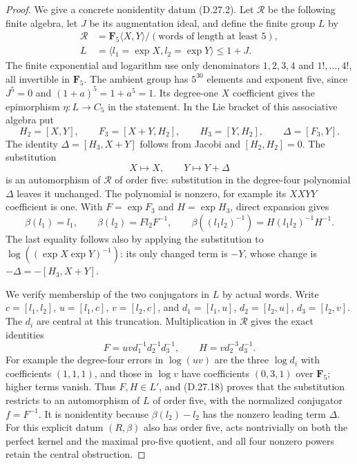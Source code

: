 \begin{proof}
We give a concrete nonidentity datum \textup{(D.27.2)}.
Let $\mathcal R$ be the following finite algebra, let $J$ be
its augmentation ideal, and define the finite group $L$ by
\[
 \begin{aligned}
 \mathcal R&=\mathbf F_5\langle X,Y\rangle/
                  (\text{words of length at least }5),\\
 L&=\langle l_1=\exp X,l_2=\exp Y\rangle\leq1+J.
 \end{aligned}
 \tag{D.27.15}
\]
The finite exponential and logarithm use only denominators
$1,2,3,4$ and $1!,\ldots,4!$, all invertible in
$\mathbf F_5$.  The ambient group has $5^{30}$ elements
and exponent five, since $J^5=0$ and $(1+a)^5=1+a^5=1$.
Its degree-one $X$ coefficient gives the epimorphism
$\eta:L\to C_5$ in the statement.
In the Lie bracket of this associative algebra put
\[
 H_2=[X,Y],\qquad F_3=[X+Y,H_2],\qquad
 H_3=[Y,H_2],\qquad \Delta=[F_3,Y].
 \tag{D.27.16}
\]
The identity $\Delta=[H_3,X+Y]$ follows from Jacobi and
$[H_2,H_2]=0$.  The substitution
\[
             X\longmapsto X,\qquad Y\longmapsto Y+\Delta
 \tag{D.27.17}
\]
is an automorphism of $\mathcal R$ of order five: substitution
in the degree-four polynomial $\Delta$ leaves it unchanged.
The polynomial is nonzero, for example its $XXYY$ coefficient
is one.  With $F=\exp F_3$ and $H=\exp H_3$, direct expansion
gives
\[
 \beta(l_1)=l_1,\qquad
 \beta(l_2)=F l_2F^{-1},\qquad
 \beta((l_1l_2)^{-1})=H(l_1l_2)^{-1}H^{-1}.
 \tag{D.27.18}
\]
The last equality follows also by applying the substitution
to $\log((\exp X\exp Y)^{-1})$: its only changed term is
$-Y$, whose change is $-\Delta=-[H_3,X+Y]$.

We verify membership of the two conjugators in $L$ by actual
words.  Write $c=[l_1,l_2]$, $u=[l_1,c]$, $v=[l_2,c]$,
and $d_1=[l_1,u]$, $d_2=[l_2,u]$, $d_3=[l_2,v]$.
The $d_i$ are central at this truncation.  Multiplication
in $\mathcal R$ gives the exact identities
\[
       F=uvd_1^{-1}d_2^{-1}d_3^{-1},\qquad
       H=v d_2^{-3}d_3^{-1}.
 \tag{D.27.19}
\]
For example the degree-four errors in $\log(uv)$ are the
three $\log d_i$ with coefficients $(1,1,1)$, and those in
$\log v$ have coefficients $(0,3,1)$ over $\mathbf F_5$;
higher terms vanish.  Thus $F,H\in L'$, and
\textup{(D.27.18)} proves that the substitution restricts
to an automorphism of $L$ of order five, with the normalized
conjugator $f=F^{-1}$.  It is nonidentity because
$\beta(l_2)-l_2$ has the nonzero leading term $\Delta$.
For this explicit datum $(R,\beta)$ also has order five,
acts nontrivially on both the perfect kernel and the
maximal pro-five quotient, and all four nonzero powers
retain the central obstruction.


\end{proof}
